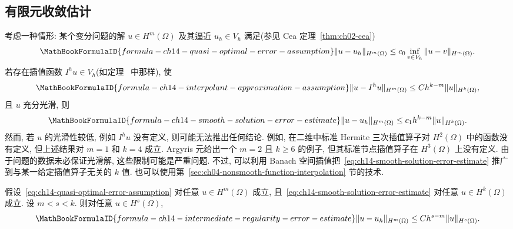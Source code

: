 \subsection{有限元收敛估计}
\label{sec:ch14-finite-element-convergence-estimates}
\setcounter{thmcount}{0}
\setcounter{equation}{0}

考虑一种情形: 某个变分问题的解 $u\in H^m(\Omega)$ 及其逼近 $u_h\in V_h$ 满足(参见 Cea 定理~\ref{thm:ch02-cea})
\begin{equation}
\MathBookFormulaID{formula-ch14-quasi-optimal-error-assumption}
\label{eq:ch14-quasi-optimal-error-assumption}
\|u-u_h\|_{H^m(\Omega)}
\leq c_0\inf_{v\in V_h}\|u-v\|_{H^m(\Omega)}.
\end{equation}
若存在插值函数 $I^hu\in V_h$(如定理~ 中那样), 使
\[
\MathBookFormulaID{formula-ch14-interpolant-approximation-assumption}
\|u-I^hu\|_{H^m(\Omega)}\leq Ch^{k-m}\|u\|_{H^k(\Omega)},
\]
且 $u$ 充分光滑, 则
\begin{equation}
\MathBookFormulaID{formula-ch14-smooth-solution-error-estimate}
\label{eq:ch14-smooth-solution-error-estimate}
\|u-u_h\|_{H^m(\Omega)}\leq c_1h^{k-m}\|u\|_{H^k(\Omega)}.
\end{equation}
然而, 若 $u$ 的光滑性较低, 例如 $I^hu$ 没有定义, 则可能无法推出任何结论. 例如, 在二维中标准 Hermite 三次插值算子对 $H^2(\Omega)$ 中的函数没有定义, 但上述结果对 $m=1$ 和 $k=4$ 成立. Argyris 元给出一个 $m=2$ 且 $k\geq6$ 的例子, 但其标准节点插值算子在 $H^3(\Omega)$ 上没有定义. 由于问题的数据未必保证光滑解, 这些限制可能是严重问题. 不过, 可以利用 Banach 空间插值把~\eqref{eq:ch14-smooth-solution-error-estimate} 推广到与某一给定插值算子无关的 $k$ 值. 也可以使用第~\ref{sec:ch04-nonsmooth-function-interpolation} 节的技术.

\begin{Theorem}
\label{thm:ch14-intermediate-regularity-error}
假设~\eqref{eq:ch14-quasi-optimal-error-assumption} 对任意 $u\in H^m(\Omega)$ 成立, 且~\eqref{eq:ch14-smooth-solution-error-estimate} 对任意 $u\in H^k(\Omega)$ 成立. 设 $m<s<k$. 则对任意 $u\in H^s(\Omega)$,
\begin{equation}
\MathBookFormulaID{formula-ch14-intermediate-regularity-error-estimate}
\label{eq:ch14-intermediate-regularity-error-estimate}
\|u-u_h\|_{H^m(\Omega)}\leq Ch^{s-m}\|u\|_{H^s(\Omega)}.
\end{equation}
\end{Theorem}

